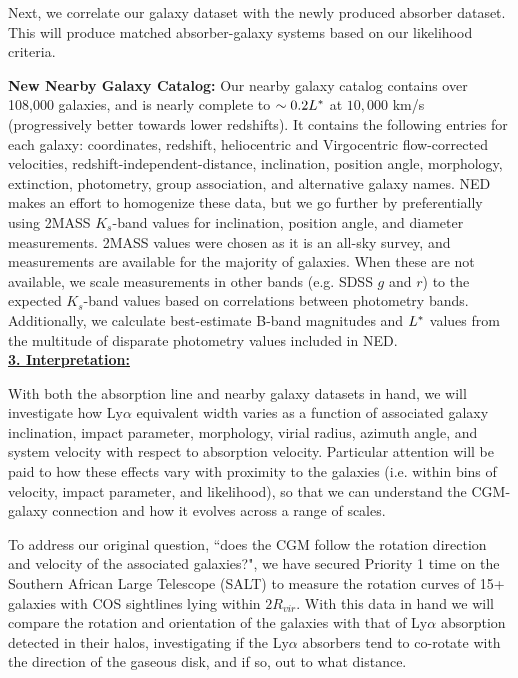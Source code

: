 \documentclass[12pt]{article}
\begin{document}
Next, we correlate our galaxy dataset with the newly produced absorber dataset. This will produce matched absorber-galaxy systems based on our likelihood criteria. 

\textbf{New Nearby Galaxy Catalog:} Our nearby galaxy catalog contains over 108,000 galaxies, and is nearly complete to $\sim0.2 L^{\**}$ at $10,000$ km/s (progressively better towards lower redshifts). It contains the following entries for each galaxy: coordinates, redshift, heliocentric and Virgocentric flow-corrected velocities, redshift-independent-distance, inclination, position angle, morphology, extinction, photometry, group association, and alternative galaxy names. NED makes an effort to homogenize these data, but we go further by preferentially using 2MASS $K_s$-band values for inclination, position angle, and diameter measurements. 2MASS values were chosen as it is an all-sky survey, and measurements are available for the majority of galaxies. When these are not available, we scale measurements in other bands (e.g. SDSS $g$ and $r$) to the expected $K_s$-band values based on correlations between photometry bands. Additionally, we calculate best-estimate B-band magnitudes and $L^{\**}$ values from the multitude of disparate photometry values included in NED. \\


\noindent \textbf{\underline{3. Interpretation:}}

With both the absorption line and nearby galaxy datasets in hand, we will investigate how Ly$\alpha$ equivalent width varies as a function of associated galaxy inclination, impact parameter, morphology, virial radius, azimuth angle, and system velocity with respect to absorption velocity. Particular attention will be paid to how these effects vary with proximity to the galaxies (i.e. within bins of velocity,  impact parameter, and likelihood), so that we can understand the CGM-galaxy connection and how it evolves across a range of scales. 

To address our original question, ``does the CGM follow the rotation direction and velocity of the associated galaxies?", we have secured Priority 1 time on the Southern African Large Telescope (SALT) to measure the rotation curves of 15+ galaxies with COS sightlines lying within $2R_{vir}$. With this data in hand we will compare the rotation and orientation of the galaxies with that of Ly$\alpha$ absorption detected in their halos, investigating if the Ly$\alpha$ absorbers tend to co-rotate with the direction of the gaseous disk, and if so, out to what distance.
\end{document}
